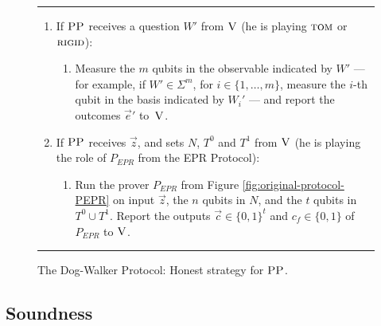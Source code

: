 \begin{figure}[H]
\rule[1ex]{\textwidth}{0.5pt}
\vspace{-20pt}
\begin{enumerate}
  \item If $\textsc{PP}$ receives a question ${W}'$ from $\textsc{V}$ (he is playing $\textsc{tom}$ or $\textsc{rigid}$):
\begin{enumerate}
     \item[]  Measure the $m$ qubits in the observable indicated by $W'$ --- for example, if $W'\in\Sigma^m$, for $i\in \{1,\ldots,m\}$, measure the $i$-th qubit in the basis indicated by $W_i'$ --- and report
       the outcomes $\vec{e}'$ to~$\textsc{V}$.
\end{enumerate}
\item If $\textsc{PP}$ receives $\vec{z}$, and sets $N$, $T^0$ and $T^1$ from $\textsc{V}$ (he is playing the role of $P_{EPR}$ from the EPR Protocol):
\begin{enumerate}
     \item[] Run the prover $P_{EPR}$ from Figure \ref{fig:original-protocol-PEPR} on input $\vec{z}$, the $n$ qubits in $N$, and the $t$ qubits in $T^0\cup T^1$.
     Report the outputs $\vec{c}\in\{0,1\}^t$ and $c_f\in\{0,1\}$ of $P_{EPR}$  to $\textsc{V}$. 
\end{enumerate}
\end{enumerate}
\rule[2ex]{\textwidth}{0.5pt}\vspace{-.5cm}
\caption{The Dog-Walker Protocol: Honest strategy for $\textsc{PP}$.}\label{fig:dogwalker-protocol-PP}
\end{figure}




\subsection{Soundness}

